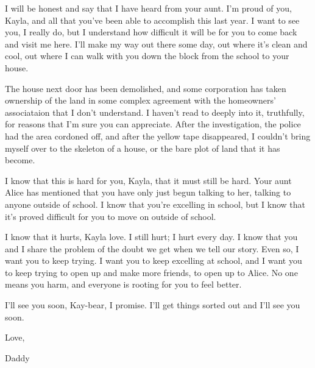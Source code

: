 \begin{itshape}
I will be honest and say that I have heard from your aunt.  I'm proud of you, Kayla, and all that you've been able to accomplish this last year.  I want to see you, I really do, but I understand how difficult it will be for you to come back and visit me here.  I'll make my way out there some day, out where it's clean and cool, out where I can walk with you down the block from the school to your house.

The house next door has been demolished, and some corporation has taken ownership of the land in some complex agreement with the homeowners' associataion that I don't understand.  I haven't read to deeply into it, truthfully, for reasons that I'm sure you can appreciate.  After the investigation, the police had the area cordoned off, and after the yellow tape disappeared, I couldn't bring myself over to the skeleton of a house, or the bare plot of land that it has become.

I know that this is hard for you, Kayla, that it must still be hard.  Your aunt Alice has mentioned that you have only just begun talking to her, talking to anyone outside of school.  I know that you're excelling in school, but I know that it's proved difficult for you to move on outside of school.

I know that it hurts, Kayla love.  I still hurt; I hurt every day.  I know that you and I share the problem of the doubt we get when we tell our story.  Even so, I want you to keep trying.  I want you to keep excelling at school, and I want you to keep trying to open up and make more friends, to open up to Alice.  No one means you harm, and everyone is rooting for you to feel better.

I'll see you soon, Kay-bear, I promise.  I'll get things sorted out and I'll see you soon.

Love,

Daddy
\end{itshape}
